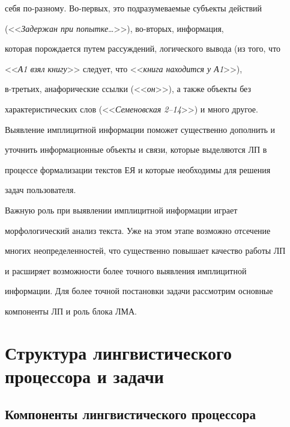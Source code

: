 себя по-разному. Во-первых, это подразумеваемые субъекты действий 


(<<\textit{Задержан при попытке}\ldots>>), во-вто\-рых, информация, 


которая порождается путем рассуждений, логического вывода (из того, что 


<<\textit{А1 взял книгу}>> следует, что <<\textit{книга находится у А1}>>), 


\mbox{в-третьих}, анафорические ссылки (<<\textit{он}>>), а также объекты без 


характеристических слов (<<\textit{Семеновская 2--14}>>) и много другое. 


Выявление имплицитной информации поможет существенно дополнить и 


уточнить информационные объекты и связи, которые выделяются ЛП в 


процессе формализации текстов ЕЯ и которые необходимы для решения 


задач пользователя.    


   


   Важную роль при выявлении имплицитной информации играет 


морфологический анализ текста. Уже на этом этапе возможно отсечение 


многих неопределенностей, что существенно повышает качество работы ЛП 


и расширяет возможности более точного выявления имплицитной 


информации. Для более точной постановки задачи рассмотрим основные 


компоненты ЛП и роль блока ЛМА.   





\vspace*{-6pt}


   


    \section{Структура лингвистического процессора и задачи}


    


    \vspace*{-4pt}


  


  \subsection{Компоненты лингвистического процессора}


